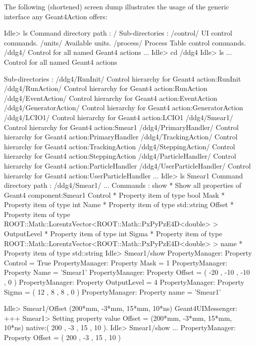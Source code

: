 \documentclass[10pt,a4paper]{article}
\begin{document}
\noindent
The following (shortened) screen dump illustrates the usage of the 
generic interface any Geant4Action offers:
\begin{unnumberedcode}
Idle> ls
Command directory path : /
 Sub-directories : 
   /control/   UI control commands.
   /units/   Available units.
   /process/   Process Table control commands.
   /ddg4/   Control for all named Geant4 actions
   ...
Idle> cd /ddg4
Idle> ls
...
Control for all named Geant4 actions

 Sub-directories : 
   /ddg4/RunInit/   Control hierarchy for Geant4 action:RunInit
   /ddg4/RunAction/   Control hierarchy for Geant4 action:RunAction
   /ddg4/EventAction/   Control hierarchy for Geant4 action:EventAction
   /ddg4/GeneratorAction/   Control hierarchy for Geant4 action:GeneratorAction
   /ddg4/LCIO1/   Control hierarchy for Geant4 action:LCIO1
   /ddg4/Smear1/   Control hierarchy for Geant4 action:Smear1
   /ddg4/PrimaryHandler/   Control hierarchy for Geant4 action:PrimaryHandler
   /ddg4/TrackingAction/   Control hierarchy for Geant4 action:TrackingAction
   /ddg4/SteppingAction/   Control hierarchy for Geant4 action:SteppingAction
   /ddg4/ParticleHandler/   Control hierarchy for Geant4 action:ParticleHandler
   /ddg4/UserParticleHandler/   Control hierarchy for Geant4 action:UserParticleHandler
   ...
Idle> ls Smear1
Command directory path : /ddg4/Smear1/
 ...
 Commands : 
   show * Show all properties of Geant4 component:Smear1
   Control * Property item of type bool
   Mask * Property item of type int
   Name * Property item of type std::string
   Offset * Property item of type ROOT::Math::LorentzVector<ROOT::Math::PxPyPzE4D<double> >
   OutputLevel * Property item of type int
   Sigma * Property item of type ROOT::Math::LorentzVector<ROOT::Math::PxPyPzE4D<double> >
   name * Property item of type std::string
Idle> Smear1/show
PropertyManager: Property Control = True
PropertyManager: Property Mask = 1
PropertyManager: Property Name = 'Smear1'
PropertyManager: Property Offset = ( -20 , -10 , -10 , 0 )
PropertyManager: Property OutputLevel = 4
PropertyManager: Property Sigma = ( 12 , 8 , 8 , 0 )
PropertyManager: Property name = 'Smear1'

Idle> Smear1/Offset (200*mm, -3*mm, 15*mm, 10*ns)
Geant4UIMessenger: +++ Smear1> Setting property value Offset = (200*mm, -3*mm, 15*mm, 10*ns)  
                               native:( 200 , -3 , 15 , 10 ).
Idle> Smear1/show                                
...
PropertyManager: Property Offset = ( 200 , -3 , 15 , 10 )

\end{unnumberedcode}
\end{document}
